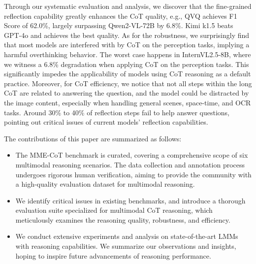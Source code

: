 Through our systematic evaluation and analysis, we discover that the fine-grained reflection capability greatly enhances the CoT quality, e.g., QVQ achieves F1 Score of 62.0\%, largely surpassing Qwen2-VL-72B by 6.8\%. Kimi k1.5 beats GPT-4o and achieves the best quality. As for the robustness, we surprisingly find that most models are interfered with by CoT on the perception tasks, implying a harmful overthinking behavior. The worst case happens in InternVL2.5-8B, where we witness a 6.8\% degradation when applying CoT on the perception tasks. This significantly impedes the applicability of models using CoT reasoning as a default practice. Moreover, for CoT efficiency, we notice that not all steps within the long CoT are related to answering the question, and the model could be distracted by the image content, especially when handling general scenes, space-time, and OCR tasks. Around 30\% to 40\% of reflection steps fail to help answer questions, pointing out critical issues of current models' reflection capabilities.



The contributions of this paper are summarized as follows:
\begin{itemize}
    \item The MME-CoT benchmark is curated, covering a comprehensive scope of six multimodal reasoning scenarios.
    The data collection and annotation process undergoes rigorous human verification, aiming to provide the community with a high-quality evaluation dataset for multimodal reasoning.


    \item We identify critical issues in existing benchmarks, and introduce a thorough evaluation suite specialized for multimodal CoT reasoning, which meticulously examines the reasoning quality, robustness, and efficiency.

    \item We conduct extensive experiments and analysis on state-of-the-art LMMs with reasoning capabilities. We summarize our observations and insights, hoping to inspire future advancements of reasoning performance.
\end{itemize}